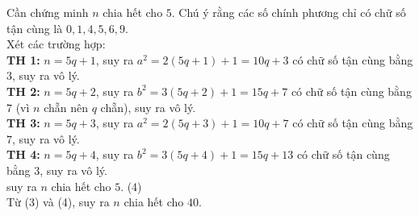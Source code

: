 \begin{ex}
{\begin{enumerate}
Cần chứng minh $n$ chia hết cho $5$. Chú ý rằng các số chính phương chỉ có chữ số tận cùng là $0,1,4,5,6,9$.\\
Xét các trường hợp:\\
\textbf{TH 1:} $n=5q+1$, suy ra $a^2=2(5q+1)+1=10q+3$ có chữ số tận cùng bằng $3$, suy ra vô lý.\\
\textbf{TH 2:} $n=5q+2$, suy ra $b^2=3(5q+2)+1=15q+7$ có chữ số tận cùng bằng $7$ (vì $n$ chẵn nên $q$ chẵn), suy ra vô lý.\\
\textbf{TH 3:} $n=5q+3$, suy ra $a^2=2(5q+3)+1=10q+7$ có chữ số tận cùng bằng $7$, suy ra vô lý.\\
\textbf{TH 4:} $n=5q+4$, suy ra $b^2=3(5q+4)+1=15q+13$ có chữ số tận cùng bằng $3$, suy ra vô lý.\\
suy ra $n$ chia hết cho $5$. \hfill(4)\\
Từ (3) và (4), suy ra $n$ chia hết cho $40$.
\end{enumerate}
}
\end{ex}

